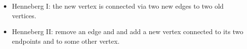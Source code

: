 \documentclass[11pt]{amsart}
\theoremstyle{definition}
\theoremstyle{remark}
\numberwithin{equation}{section}
\begin{document}
\begin{itemize}
  \item Henneberg I: the new vertex is connected via two new edges to two old vertices.
  \item Henneberg II: remove an edge and and add a new vertex connected to its two endpoints and to some other vertex.
\end{itemize}
\begin{figure}[htp]
  \centering



\begin{tikzpicture}[x=0.75pt,y=0.75pt,yscale=-1,xscale=1]


\end{tikzpicture}
\end{figure}
\end{document}
